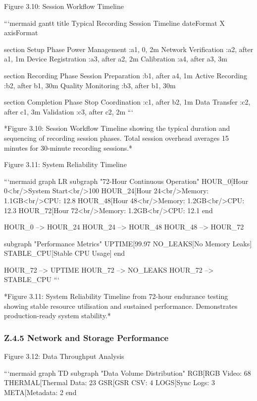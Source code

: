 Figure 3.10: Session Workflow Timeline

```mermaid
gantt
    title Typical Recording Session Timeline
    dateFormat X
    axisFormat %

    section Setup Phase
    Power Management          :a1, 0, 2m
    Network Verification      :a2, after a1, 1m
    Device Registration       :a3, after a2, 2m
    Calibration              :a4, after a3, 3m

    section Recording Phase
    Session Preparation      :b1, after a4, 1m
    Active Recording         :b2, after b1, 30m
    Quality Monitoring       :b3, after b1, 30m

    section Completion Phase
    Stop Coordination        :c1, after b2, 1m
    Data Transfer           :c2, after c1, 3m
    Validation              :c3, after c2, 2m
```

*Figure 3.10: Session Workflow Timeline showing the typical duration and
sequencing of recording session phases. Total session overhead averages
15 minutes for 30-minute recording sessions.*

Figure 3.11: System Reliability Timeline

```mermaid
graph LR
    subgraph "72-Hour Continuous Operation"
        HOUR_0[Hour 0<br/>System Start<br/>100%
        HOUR_24[Hour 24<br/>Memory: 1.1GB<br/>CPU: 12.8%
        HOUR_48[Hour 48<br/>Memory: 1.2GB<br/>CPU: 12.3%
        HOUR_72[Hour 72<br/>Memory: 1.2GB<br/>CPU: 12.1%
    end

    HOUR_0 --> HOUR_24
    HOUR_24 --> HOUR_48
    HOUR_48 --> HOUR_72

    subgraph "Performance Metrics"
        UPTIME[99.97%
        NO_LEAKS[No Memory Leaks]
        STABLE_CPU[Stable CPU Usage]
    end

    HOUR_72 --> UPTIME
    HOUR_72 --> NO_LEAKS
    HOUR_72 --> STABLE_CPU
```

*Figure 3.11: System Reliability Timeline from 72-hour endurance testing
showing stable resource utilisation and sustained performance.
Demonstrates production-ready system stability.*

\subsubsection{Z.4.5 Network and Storage Performance}

Figure 3.12: Data Throughput Analysis

```mermaid
graph TD
    subgraph "Data Volume Distribution"
        RGB[RGB Video: 68%
        THERMAL[Thermal Data: 23%
        GSR[GSR CSV: 4%
        LOGS[Sync Logs: 3%
        META[Metadata: 2%
    end

